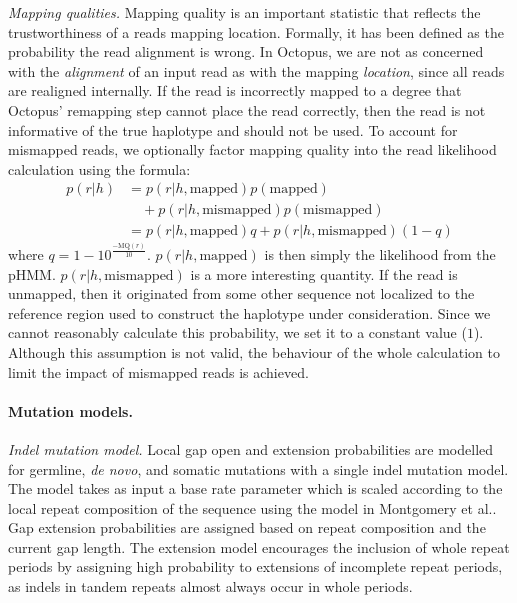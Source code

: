 \documentclass[notitlepage, twocolumn, 10pt]{article}
\begin{document}
\vspace{3mm}
\noindent\emph{Mapping qualities.} Mapping quality is an important statistic that reflects the trustworthiness of a reads mapping location. Formally, it has been defined as the probability the read alignment is wrong. In Octopus, we are not as concerned with the \emph{alignment} of an input read as with the mapping \emph{location}, since all reads are realigned internally. If the read is incorrectly mapped to a degree that Octopus' remapping step cannot place the read correctly, then the read is not informative of the true haplotype and should not be used. To account for mismapped reads, we optionally factor mapping quality into the read likelihood calculation using the formula:
\begin{align*}
	p(r | h) &= p(r | h, \text{mapped})p(\text{mapped}) \\
              & \quad + p(r | h, \text{mismapped})p(\text{mismapped})\\
	         &= p(r | h, \text{mapped})q + p(r | h, \text{mismapped})(1 - q)
\end{align*}
where $q = 1 - 10^{\frac{-\text{MQ}(r)}{10}}$. $p(r | h, \text{mapped})$ is then simply the likelihood from the pHMM. $p(r | h, \text{mismapped})$ is a more interesting quantity. If the read is unmapped, then it originated from some other sequence not localized to the reference region used to construct the haplotype under consideration. Since we cannot reasonably calculate this probability, we set it to a constant value ($1$). Although this assumption is not valid, the behaviour of the whole calculation to limit the impact of mismapped reads is achieved.

\paragraph*{Mutation models.} \emph{Indel mutation model.} Local gap open and extension probabilities are modelled for germline, \textit{de novo}, and somatic mutations with a single indel mutation model. The model takes as input a base rate parameter which is scaled according to the local repeat composition of the sequence using the model in Montgomery et al.\cite{RN577}. Gap extension probabilities are assigned based on repeat composition and the current gap length. The extension model encourages the inclusion of whole repeat periods by assigning high probability to extensions of incomplete
repeat periods, as indels in tandem repeats almost always occur in whole periods.
\end{document}
